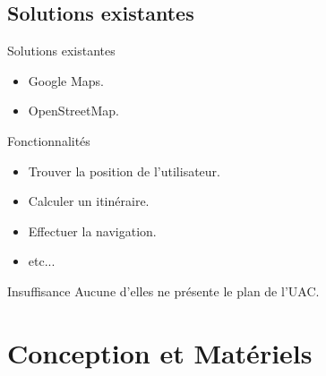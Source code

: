 \documentclass[11pt,handout]{beamer}
\begin{document}
		\subsection{Solutions existantes}
			\begin{frame}
			    \begin{exampleblock}{Solutions existantes}
				\begin{itemize}
				 [square]
				 \item Google Maps.
				 \item OpenStreetMap.
				\end{itemize}
			    \end{exampleblock}
			    \begin{block}{Fonctionnalités}
				\begin{itemize}
				 \item Trouver la position de l'utilisateur.
				 \item Calculer un itinéraire.
				 \item Effectuer la navigation.
				 \item etc...
				\end{itemize}
			    \end{block}
			     \begin{alertblock}{Insuffisance}
			      Aucune d'elles ne présente le plan de l'UAC.
			  \end{alertblock}
			\end{frame}		
	\section{Conception et Matériels}
\end{document}
